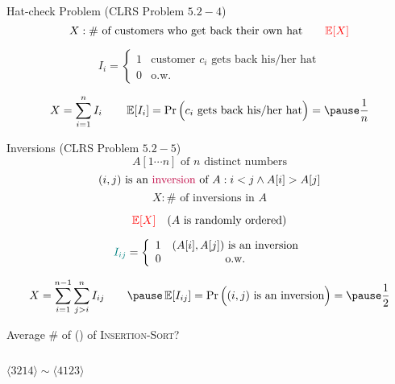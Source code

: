 
\begin{frame}{}
  \begin{exampleblock}{Hat-check Problem (CLRS Problem $5.2-4$)}
    \[
      X: \# \text{ of customers who get back their own hat} \qquad \textcolor{red}{\operatorname*{\mathbb{E}}[X]}
    \]
  \end{exampleblock}

  \pause
  \[
    I_i = \left\{\begin{array}{lc}
      1 & \text{customer } c_i \text{ gets back his/her hat} \\
      0 & \text{o.w.}
    \end{array}\right.
  \]

  \pause
  \[
    X = \sum_{i=1}^{n} I_i \qquad \E[I_i] = \Pr\Big( c_i \text{ gets back his/her hat} \Big) = \pause \frac{1}{n}
  \]
\end{frame}

\begin{frame}{}
  \begin{exampleblock}{Inversions (CLRS Problem $5.2-5$)}
    \[
      A[1 \cdots n] \text{ of } n \text{ distinct numbers}
    \]
    \[
      (i,j) \text{ is an \textcolor{purple}{inversion} of } A : i < j \land A[i] > A[j]
    \]
    \[
      X: \# \text{ of inversions in } A
    \]

    \pause
    \[
      \textcolor{red}{\operatorname*{\mathbb{E}}[X]} \quad (A \text{ is randomly ordered})
    \]
  \end{exampleblock}

  \pause
  \[
    \textcolor{teal}{I_{ij}} = \left\{\begin{array}{lc}
      1 & (A[i], A[j]) \text{ is an inversion} \\
      0 & \text{o.w.}
    \end{array}\right.
  \]

  \[
    X = \sum_{i=1}^{n-1} \sum_{j>i}^{n} I_{ij} \qquad \pause \E[I_{ij}] = \Pr\Big((i,j) \text{ is an inversion}\Big) = \pause \frac{1}{2}
  \]
\end{frame}

\begin{frame}{}
  \centerline{ Average \# of  () of \textsc{Insertion-Sort}?}

  \vspace{0.30cm}
  \begin{columns}
      \pause
      \pause
      \[
	\langle 3214 \rangle \sim \langle 4123 \rangle
      \]
  \end{columns}
\end{frame}
